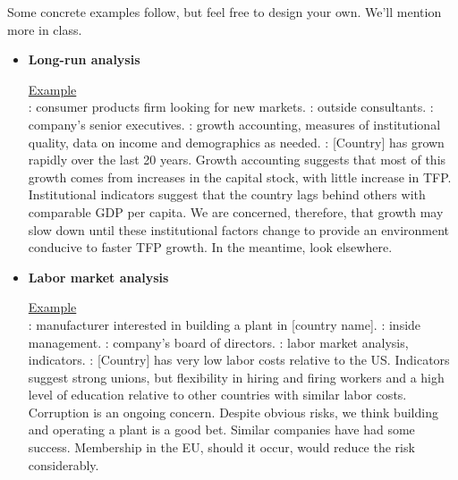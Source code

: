 \documentclass[letterpaper,12pt]{article}
\begin{document}
Some concrete examples follow, but feel free to design your own. 
We'll mention more in class. 
%
\begin{itemize}

\item {\bf Long-run analysis}

\underline{Example} \\
:  consumer products firm looking for new markets.
:  outside consultants.
:  company's senior executives.
:  growth accounting, measures of institutional quality,
 data on income and demographics as needed.
:  [Country] has grown rapidly over the last 20 years.
Growth accounting suggests that most of this growth comes from increases in the
capital stock, with little increase in TFP.
Institutional indicators suggest that the country lags behind others with comparable GDP per capita.
We are concerned, therefore, that growth may slow down until these institutional factors
change to provide an environment conducive to faster TFP growth.  In the meantime, look elsewhere.

\item {\bf Labor market analysis}

\underline{Example} \\
:  manufacturer interested in building a plant in [country name].
: inside management.
:  company's board of directors.
:  labor market analysis, indicators.  
:  [Country] has very low labor costs relative to the US.
Indicators suggest strong unions, but flexibility in hiring and firing workers
and a high level of education relative to other countries with similar labor costs.
Corruption is an ongoing concern.
Despite obvious risks, we think building and operating a plant is a good bet.
Similar companies have had some success.
Membership in the EU, should it occur, would reduce the risk considerably.


\end{itemize}
\end{document}
